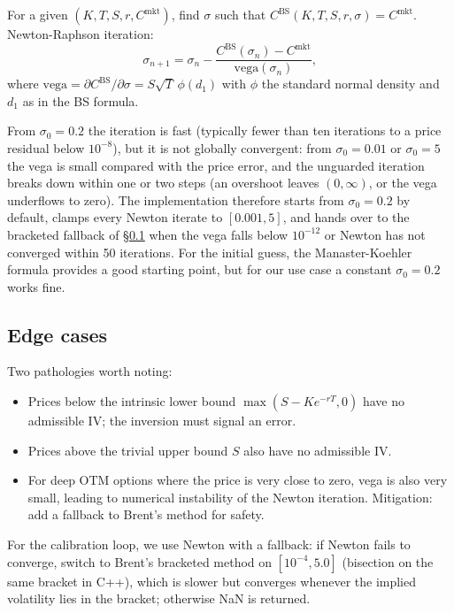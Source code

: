 \documentclass[11pt]{article}
\theoremstyle{plain}
\theoremstyle{definition}
\theoremstyle{remark}
\begin{document}
For a given $(K, T, S, r, C^{\mathrm{mkt}})$, find $\sigma$ such that $C^{\mathrm{BS}}(K, T, S, r, \sigma) = C^{\mathrm{mkt}}$. Newton-Raphson iteration:
\begin{equation}
    \sigma_{n+1} = \sigma_n - \frac{C^{\mathrm{BS}}(\sigma_n) - C^{\mathrm{mkt}}}{\mathrm{vega}(\sigma_n)},                                                                                            \label{eq:newton-iv}
\end{equation}
where $\mathrm{vega} = \partial C^{\mathrm{BS}} / \partial \sigma = S \sqrt{T}\, \phi(d_1)$ with $\phi$ the standard normal density and $d_1$ as in the BS formula.

From $\sigma_0 = 0.2$ the iteration is fast (typically fewer than ten iterations to a price residual below $10^{-8}$), but it is not globally convergent: from $\sigma_0 = 0.01$ or $\sigma_0 = 5$ the vega is small compared with the price error, and the unguarded iteration breaks down within one or two steps (an overshoot leaves $(0, \infty)$, or the vega underflows to zero). The implementation therefore starts from $\sigma_0 = 0.2$ by default, clamps every Newton iterate to $[0.001, 5]$, and hands over to the bracketed fallback of \S\ref{sec:iv-edge} when the vega falls below $10^{-12}$ or Newton has not converged within 50 iterations. For the initial guess, the Manaster-Koehler formula provides a good starting point, but for our use case a constant $\sigma_0 = 0.2$ works fine.

\subsection{Edge cases}
\label{sec:iv-edge}

Two pathologies worth noting:
\begin{itemize}[topsep=2pt]
    \item Prices below the intrinsic lower bound $\max(S - K e^{-rT}, 0)$ have no admissible IV; the inversion must signal an error.
    \item Prices above the trivial upper bound $S$ also have no admissible IV.
    \item For deep OTM options where the price is very close to zero, vega is also very small, leading to numerical instability of the Newton iteration. Mitigation: add a fallback to Brent's method for safety.
\end{itemize}
For the calibration loop, we use Newton with a fallback: if Newton fails to converge, switch to Brent's bracketed method on $[10^{-4}, 5.0]$ (bisection on the same bracket in C++), which is slower but converges whenever the implied volatility lies in the bracket; otherwise NaN is returned.
\end{document}
